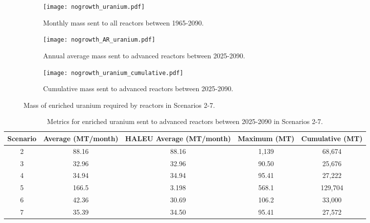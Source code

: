 \begin{figure}[h!]
    \centering
    \begin{subfigure}[b]{0.45\textwidth}
        \centering
        \texttt{[image: nogrowth\_uranium.pdf]}
        \caption{Monthly mass sent to all reactors 
        between 1965-2090.}
        \label{fig:nogrowth_all_uranium}
    \end{subfigure}
    \hfill
    \begin{subfigure}[b]{0.45\textwidth}
        \centering
        \texttt{[image: nogrowth\_AR\_uranium.pdf]}
        \caption{Annual average mass sent to 
        advanced reactors between 2025-2090.}
        \label{fig:nogrowth_AR_uranium}
    \end{subfigure}
    \begin{subfigure}[b]{0.45\textwidth}
        \centering
        \texttt{[image: nogrowth\_uranium\_cumulative.pdf]}
        \caption{Cumulative mass sent to advanced reactors between 2025-2090.}
        \label{fig:nogrowth_uranium_cumulative}
    \end{subfigure}
       \caption{Mass of enriched uranium required by reactors
        in Scenarios 2-7.}
       \label{fig:nogrowth_uranium}
\end{figure}

\begin{table}[h!]
    \centering 
    \caption{Metrics for enriched uranium sent to advanced 
    reactors between 2025-2090 in Scenarios 2-7.}
    \label{tab:nogrowth_uranium}
    \begin{tabular}{c c c c c}
        \hline
        Scenario & Average (MT/month) & \gls{HALEU} Average 
        (MT/month) & Maximum (MT)& Cumulative (MT)\\\hline
        2 & 88.16 & 88.16 & 1,139 & 68,674\\
        3 & 32.96 & 32.96 & 90.50 & 25,676\\
        4 & 34.94 & 34.94 & 95.41 & 27,222\\
        5 & 166.5 & 3.198 & 568.1 & 129,704\\
        6 & 42.36 & 30.69 & 106.2 & 33,000\\
        7 & 35.39 & 34.50 & 95.41 & 27,572\\
        \hline
    \end{tabular}
\end{table}

